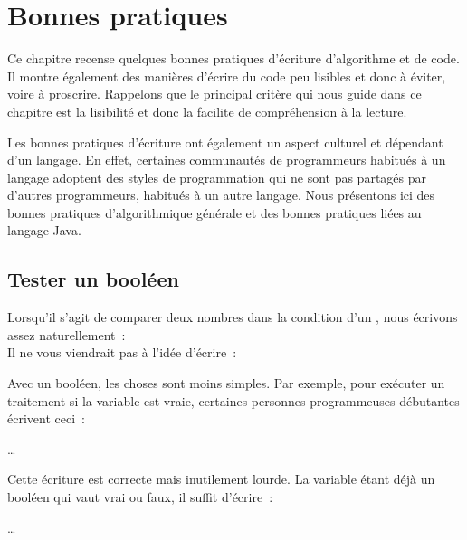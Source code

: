 \chapter{Bonnes pratiques}
\label{bonnespratiques}

	Ce chapitre recense quelques bonnes pratiques d'écriture d'algorithme et de
	code. Il montre également des manières d'écrire du code peu lisibles et donc
	à éviter, voire à proscrire. Rappelons que le principal critère qui nous
	guide dans ce chapitre est la lisibilité et donc la facilite de
	compréhension à la lecture. 
	
	Les bonnes pratiques d'écriture ont également un aspect culturel et
	dépendant d'un langage. En effet, certaines communautés de programmeurs
	habitués à un langage adoptent des styles de programmation qui ne sont pas
	partagés par d'autres programmeurs, habitués à un autre langage. Nous
	présentons ici des bonnes pratiques d'algorithmique générale et des bonnes
	pratiques liées au langage Java. 

\minitoc
	
\section{Tester un booléen}

	Lorsqu’il s’agit de comparer deux nombres dans la condition
	d’un , nous écrivons assez naturellement~:
	\\Il ne vous viendrait pas à l’idée d’écrire~:
	
	\bigskip
		
	Avec un booléen, les choses sont moins simples.  Par exemple, 
	pour exécuter un traitement si la variable  est vraie, certaines
	personnes programmeuses débutantes écrivent ceci~:
	
	\clearpage
	\begin{wrong}
	\begin{pseudocode} 
			\Stmt \dots 
		\EndIf 
	\end{pseudocode} 
	\end{wrong}

	Cette écriture est correcte mais inutilement lourde.  La variable étant déjà
	un booléen qui vaut vrai ou faux, il suffit d’écrire~:

	\begin{pseudocode}
		\If{adult}
			\Stmt \dots
		\EndIf
	\end{pseudocode}
	
